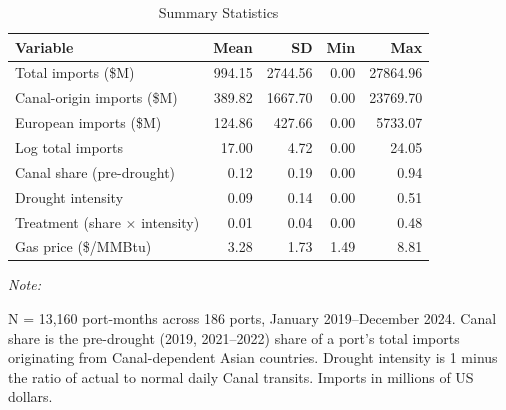 \begin{table}[!h]
\centering
\caption{\label{tab:summary}Summary Statistics}
\centering
\begin{threeparttable}
\begin{tabular}[t]{lrrrr}
\toprule
Variable & Mean & SD & Min & Max\\
\midrule
Total imports (\$M) & 994.15 & 2744.56 & 0.00 & 27864.96\\
Canal-origin imports (\$M) & 389.82 & 1667.70 & 0.00 & 23769.70\\
European imports (\$M) & 124.86 & 427.66 & 0.00 & 5733.07\\
Log total imports & 17.00 & 4.72 & 0.00 & 24.05\\
Canal share (pre-drought) & 0.12 & 0.19 & 0.00 & 0.94\\
\addlinespace
Drought intensity & 0.09 & 0.14 & 0.00 & 0.51\\
Treatment (share $\times$ intensity) & 0.01 & 0.04 & 0.00 & 0.48\\
Gas price (\$/MMBtu) & 3.28 & 1.73 & 1.49 & 8.81\\
\bottomrule
\end{tabular}
\begin{tablenotes}
\item \textit{Note: } 
\item N = 13,160 port-months across 186 ports, January 2019--December 2024. Canal share is the pre-drought (2019, 2021--2022) share of a port's total imports originating from Canal-dependent Asian countries. Drought intensity is 1 minus the ratio of actual to normal daily Canal transits. Imports in millions of US dollars.
\end{tablenotes}
\end{threeparttable}
\end{table}
